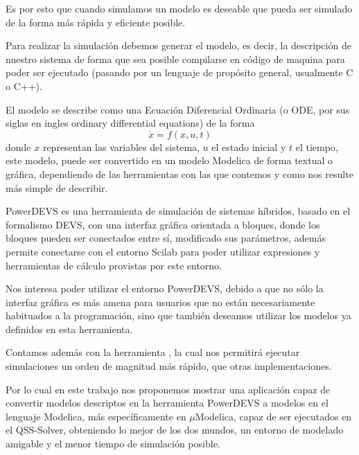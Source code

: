 Es por esto que cuando simulamos un modelo es deseable que pueda ser simulado de la forma más rápida y eficiente posible.

Para realizar la simulación debemos generar el modelo, es decir, la descripción de nuestro sistema de forma que sea posible compilarse en código de maquina para poder ser ejecutado (pasando por un lenguaje de propósito general, usualmente C o C++). 

El modelo se describe como una Ecuación Diferencial Ordinaria (o ODE, por sus siglas en ingles ordinary differential equations) de la forma
\begin{equation*}
	\dot{x} = f(x, u, t)
\end{equation*}
donde $x$ representan las variables del sistema, $u$ el estado inicial y $t$ el tiempo, este modelo, puede ser convertido en un modelo Modelica\cite{Fri98}\cite{Fritzson02modelica} de forma textual o gráfica, dependiendo de las herramientas con las que contemos y como nos resulte más simple de describir.

PowerDEVS\cite{BK11} es una herramienta de simulación de sistemas híbridos, basado en el formalismo DEVS\cite{Zeigler}, con una interfaz gráfica orientada a bloques, donde los bloques pueden ser conectados entre sí, modificado sus parámetros, además permite conectarse con el entorno Scilab para poder utilizar expresiones y herramientas de cálculo provistas por este entorno.

Nos interesa poder utilizar el entorno PowerDEVS\cite{BK11}, debido a que no sólo la interfaz gráfica es más amena para usuarios que no están necesariamente habituados a la programación, sino que también deseamos utilizar los modelos ya definidos en esta herramienta.

Contamos además con la herramienta \cite{Ber12}, la cual nos permitirá ejecutar simulaciones un orden de magnitud más rápido, que otras implementaciones.

Por lo cual en este trabajo nos proponemos mostrar una aplicación capaz de convertir modelos descriptos en la herramienta PowerDEVS\cite{BK11} a modelos en el lenguaje Modelica\cite{Fri98}\cite{Fritzson02modelica}, más específicamente en $\mu$Modelica\cite{Ber12}, capaz de ser ejecutados en el QSS-Solver\cite{Ber12}, obteniendo lo mejor de los dos mundos, un entorno de modelado amigable y el menor tiempo de simulación posible.


